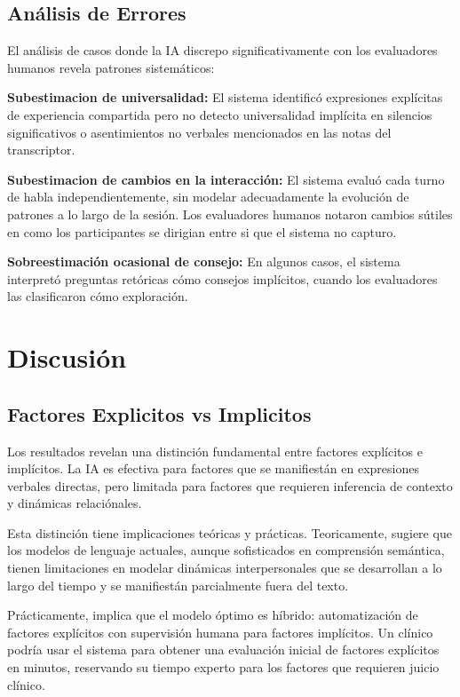 \documentclass[12pt,a4paper,twoside]{book}
\begin{document}
\subsection{Análisis de Errores}

El análisis de casos donde la IA discrepo significativamente con los evaluadores humanos revela patrones sistemáticos:

\textbf{Subestimacion de universalidad:} El sistema identificó expresiones explícitas de experiencia compartida pero no detecto universalidad implícita en silencios significativos o asentimientos no verbales mencionados en las notas del transcriptor.

\textbf{Subestimacion de cambios en la interacción:} El sistema evaluó cada turno de habla independientemente, sin modelar adecuadamente la evolución de patrones a lo largo de la sesión. Los evaluadores humanos notaron cambios sútiles en como los participantes se dirigian entre si que el sistema no capturo.

\textbf{Sobreestimación ocasional de consejo:} En algunos casos, el sistema interpretó preguntas retóricas cómo consejos implícitos, cuando los evaluadores las clasificaron cómo exploración.

\section{Discusión}

\subsection{Factores Explicitos vs Implicitos}

Los resultados revelan una distinción fundamental entre factores explícitos e implícitos. La IA es efectiva para factores que se manifiestán en expresiones verbales directas, pero limitada para factores que requieren inferencia de contexto y dinámicas relaciónales.

Esta distinción tiene implicaciones teóricas y prácticas. Teoricamente, sugiere que los modelos de lenguaje actuales, aunque sofisticados en comprensión semántica, tienen limitaciones en modelar dinámicas interpersonales que se desarrollan a lo largo del tiempo y se manifiestán parcialmente fuera del texto.

Prácticamente, implica que el modelo óptimo es híbrido: automatización de factores explícitos con supervisión humana para factores implícitos. Un clínico podría usar el sistema para obtener una evaluación inicial de factores explícitos en minutos, reservando su tiempo experto para los factores que requieren juicio clínico.
\end{document}
